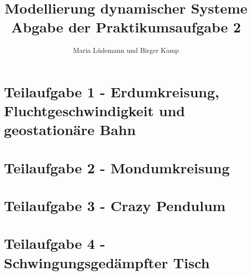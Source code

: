 \documentclass[]{scrartcl}
\title{Modellierung dynamischer Systeme  \\ Abgabe der Praktikumsaufgabe 2}
\author{Maria Lüdemann und Birger Kamp}
\begin{document}
\maketitle
{}
\tableofcontents

\section{Teilaufgabe 1 - Erdumkreisung, Fluchtgeschwindigkeit und geostationäre Bahn}

\section{Teilaufgabe 2 - Mondumkreisung}

\section{Teilaufgabe 3 - Crazy Pendulum}

\section{Teilaufgabe 4 - Schwingungsgedämpfter Tisch}
\end{document}
